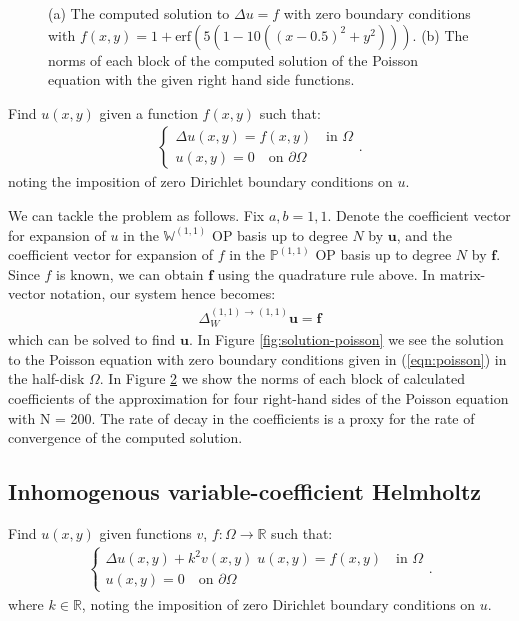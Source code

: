 \documentclass[11pt, oneside]{article}   	%
\newcommand{\bstodo}{\todo[color=pink]}
\newcommand{\R}{\mathbb{R}}
\newcommand{\bigPii}{{\mathbb{P}^{(1,1)}}}
\newcommand{\laplacewii}{\Delta_W^{(1,1)\to(1,1)}}
\newcommand{\bigWii}{{\mathbb{W}^{(1,1)}}}
\begin{document}
\begin{figure}
\begin{subfigure}[t]{0.4\textwidth}
	\centering
	\caption{}
        	\label{fig:solutionblocknorms}
	\end{subfigure}
	\caption{(a) The computed solution to $\Delta u = f$ with zero boundary conditions with $f(x,y) = 1 + \text{erf}(5(1 - 10((x - 0.5)^2 + y^2)))$. (b) The norms of each block of the computed solution of the Poisson equation with the given right hand side functions.}
	\centering
\end{figure}



Find \(u(x,y)\) given a function \(f(x,y)\) such that:
\begin{align}
	\begin{cases}
    		\Delta u(x,y) = f(x,y) \quad \text{in } \Omega \\
		u(x,y) = 0 \quad \text{on } \partial \Omega
	\end{cases}.
	\label{eqn:poisson}
\end{align}
noting the imposition of zero Dirichlet boundary conditions on $u$.

We can tackle the problem as follows. Fix \(a, b = 1,1\). Denote the coefficient vector for expansion of $u$ in the $\bigWii$ OP basis up to degree $N$ by $\mathbf{u}$, and the coefficient vector for expansion of $f$ in the $\bigPii$ OP basis up to degree $N$ by $\mathbf{f}$. Since $f$ is known, we can obtain $\mathbf{f}$ using the quadrature rule above. In matrix-vector notation, our system hence becomes:
\begin{align}
    \laplacewii \mathbf{u} = \mathbf{f}
\end{align}
which can be solved to find $\mathbf{u}$.
In Figure \ref{fig:solution-poisson} we see the solution to the Poisson equation with zero boundary conditions given in (\ref{eqn:poisson}) in the half-disk $\Omega$. In Figure \ref{fig:solutionblocknorms} we show the norms of each block of calculated coefficients of the approximation for four right-hand sides of the Poisson equation with N = 200. The rate of decay in the coefficients is a proxy for the rate of convergence of the computed solution. \bstodo{Describe what plot tells us}


\subsection{Inhomogenous variable-coefficient Helmholtz}

Find \(u(x,y)\) given functions $v$, $f : \Omega \to \R$ such that:
\begin{align}
	\begin{cases}
    		\Delta u(x,y) + k^2 v(x,y) \; u(x,y) = f(x,y) \quad \text{in } \Omega \\
		u(x,y) = 0 \quad \text{on } \partial \Omega
	\end{cases}.
	\label{eqn:helmholtz}
\end{align}
where $k \in \R$, noting the imposition of zero Dirichlet boundary conditions on $u$.
\end{document}

